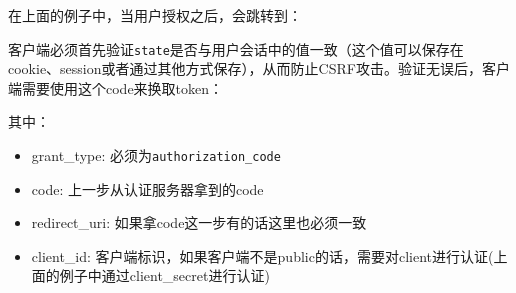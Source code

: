 \documentclass[12pt]{article}
\begin{document}
在上面的例子中，当用户授权之后，会跳转到：

\begin{Shaded}
\begin{Highlighting}[]
\OperatorTok{://}\OperatorTok{/}\OperatorTok{/}\OperatorTok{{-}}
  \OperatorTok{=}\OperatorTok{{-}}
  \OperatorTok{\&}\OperatorTok{=}
\end{Highlighting}
\end{Shaded}

客户端必须首先验证\texttt{state}是否与用户会话中的值一致（这个值可以保存在cookie、session或者通过其他方式保存），从而防止CSRF攻击。验证无误后，客户端需要使用这个code来换取token：

\begin{Shaded}
\begin{Highlighting}[]
 \OperatorTok{://}\OperatorTok{{-}}\OperatorTok{/}

\OperatorTok{=}
\OperatorTok{\&}\OperatorTok{=}
\OperatorTok{\&}\OperatorTok{=}\OperatorTok{{-}}
\OperatorTok{\&}\OperatorTok{=}\OperatorTok{://}\OperatorTok{/}\OperatorTok{/}\OperatorTok{{-}}
\OperatorTok{\&}\OperatorTok{=}
\end{Highlighting}
\end{Shaded}

其中：

\begin{itemize}
\tightlist
\item
  grant\_type: 必须为\texttt{authorization\_code}
\item
  code: 上一步从认证服务器拿到的code
\item
  redirect\_uri: 如果拿code这一步有的话这里也必须一致
\item
  client\_id: 客户端标识，如果客户端不是public的话，需要对client进行认证(上面的例子中通过client\_secret进行认证)
\end{itemize}
\end{document}
